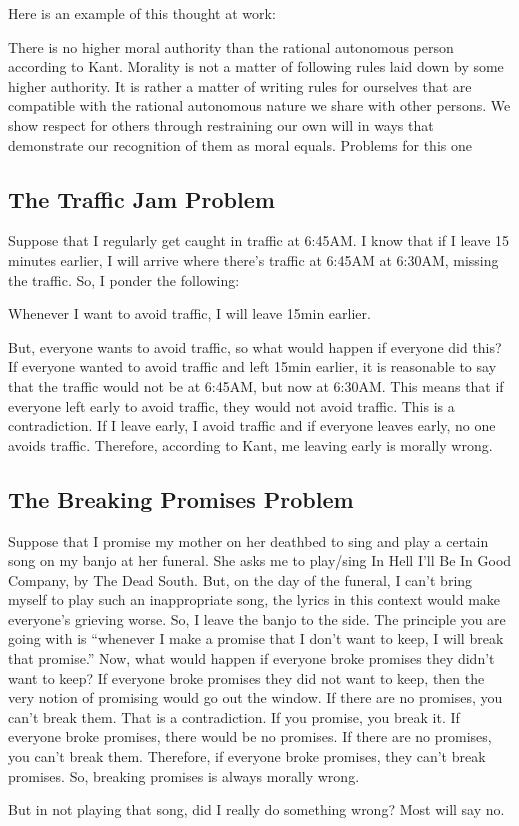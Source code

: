 Here is an example of this thought at work:


There is no higher moral authority than the rational autonomous person according to Kant. Morality is not a matter of following rules laid down by some higher authority. It is rather a matter of writing rules for ourselves that are compatible with the rational autonomous nature we share with other persons. We show respect for others through restraining our own will in ways that demonstrate our recognition of them as moral equals.
Problems for this one
\subsection{The Traffic Jam Problem}

Suppose that I regularly get caught in traffic at 6:45AM. I know that if I leave 15 minutes earlier, I will arrive where there’s traffic at 6:45AM at 6:30AM, missing the traffic. So, I ponder the following:
\begin{center}
    Whenever I want to avoid traffic, I will leave 15min earlier.
\end{center}
But, everyone wants to avoid traffic, so what would happen if everyone did this? If everyone wanted to avoid traffic and left 15min earlier, it is reasonable to say that the traffic would not be at 6:45AM, but now at 6:30AM. This means that if everyone left early to avoid traffic, they would not avoid traffic. This is a contradiction. If I leave early, I avoid traffic and if everyone leaves early, no one avoids traffic. Therefore, according to Kant, me leaving early is morally wrong.
\subsection{The Breaking Promises Problem}

Suppose that I promise my mother on her deathbed to sing and play a certain song on my banjo at her funeral. She asks me to play/sing In Hell I'll Be In Good Company, by The Dead South. But, on the day of the funeral, I can't bring myself to play such an inappropriate song, the lyrics in this context would make everyone's grieving worse. So, I leave the banjo to the side. The principle you are going with is “whenever I make a promise that I don’t want to keep, I will break that promise.” Now, what would happen if everyone broke promises they didn’t want to keep? If everyone broke promises they did not want to keep, then the very notion of promising would go out the window. If there are no promises, you can’t break them. That is a contradiction. If you promise, you break it. If everyone broke promises, there would be no promises. If there are no promises, you can’t break them. Therefore, if everyone broke promises, they can’t break promises. So, breaking promises is always morally wrong.

But in not playing that song, did I really do something wrong? Most will say no.


